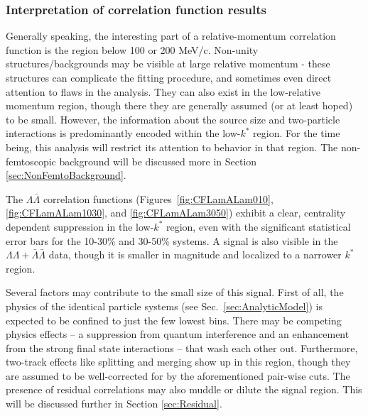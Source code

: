 \subsubsection{Interpretation of correlation function results}
\label{sec:CFInterpretation}


Generally speaking, the interesting part of a relative-momentum correlation function is the region below 100 or 200 MeV/c.  
Non-unity structures/backgrounds may be visible at large relative momentum - these structures can complicate the fitting procedure, and sometimes even direct attention to flaws in the analysis.  
They can also exist in the low-relative momentum region, though there they are generally assumed (or at least hoped) to be small.
However, the information about the source size and two-particle interactions is predominantly encoded within the low-$k^*$ region.  
For the time being, this analysis will restrict its attention to behavior in that region.
The non-femtoscopic background will be discussed more in Section \ref{sec:NonFemtoBackground}.

The $\Lambda\bar{\Lambda}$ correlation functions (Figures\ \ref{fig:CFLamALam010}, \ref{fig:CFLamALam1030}, and \ref{fig:CFLamALam3050}) exhibit a clear, centrality dependent suppression in the low-$k^*$ region, even with the significant statistical error bars for the 10-30\% and 30-50\% systems.  
A signal is also visible in the $\Lambda\Lambda + \bar{\Lambda}\bar{\Lambda}$ data, though it is smaller in magnitude and localized to a narrower $k^*$ region. 

Several factors may contribute to the small size of this signal.  
First of all, the physics of the identical particle systems (see Sec.\ \ref{sec:AnalyticModel}) is expected to be confined to just the few lowest bins.  
There may be competing physics effects -- a suppression from quantum interference and an enhancement from the strong final state interactions -- that wash each other out.  
Furthermore, two-track effects like splitting and merging show up in this region, though they are assumed to be well-corrected for by the aforementioned pair-wise cuts.  
The presence of residual correlations may also muddle or dilute the signal region.  
This will be discussed further in Section \ref{sec:Residual}.  

